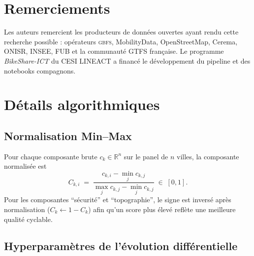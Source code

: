 \documentclass[11pt,a4paper]{article}
\newcommand{\GBFS}{\textsc{gbfs}\xspace}
\begin{document}
\section*{Remerciements}

Les auteurs remercient les producteurs de données ouvertes ayant
rendu cette recherche possible : opérateurs \GBFS, MobilityData,
OpenStreetMap, Cerema, ONISR, INSEE, FUB et la communauté GTFS
française. Le programme \emph{BikeShare-ICT} du CESI LINEACT a
financé le développement du pipeline et des notebooks
compagnons.

\appendix

\section{Détails algorithmiques}
\label{app:algo}

\subsection{Normalisation Min--Max}

Pour chaque composante brute $c_k \in \mathbb{R}^{n}$ sur le panel
de $n$ villes, la composante normalisée est
\begin{equation*}
    C_{k,i} \;=\;
    \frac{c_{k,i} - \min_{j} c_{k,j}}
         {\max_{j} c_{k,j} - \min_{j} c_{k,j}} \;\in\; [0, 1].
\end{equation*}
Pour les composantes \enquote{sécurité} et
\enquote{topographie}, le signe est inversé après normalisation
($C_k \leftarrow 1 - C_k$) afin qu'un score plus élevé reflète
une meilleure qualité cyclable.

\subsection{Hyperparamètres de l'évolution différentielle}
\end{document}
